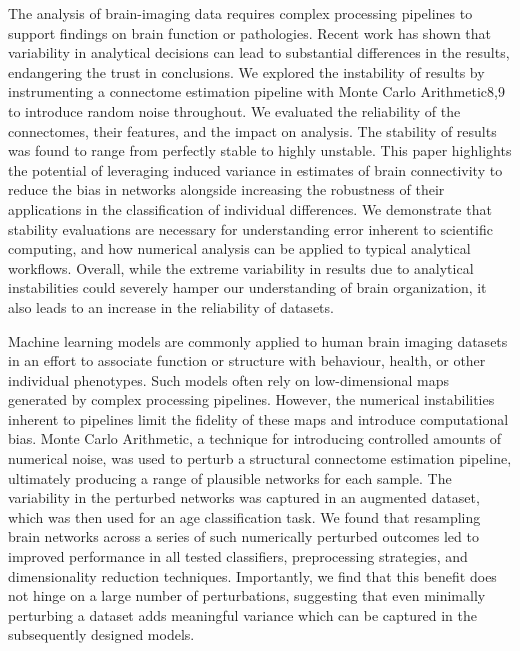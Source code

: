The analysis of brain-imaging data requires complex processing pipelines to support findings on brain function or
pathologies. Recent work has shown that variability in analytical decisions can lead to substantial differences in the
results, endangering the trust in conclusions. We explored the instability of results by instrumenting a connectome
estimation pipeline with Monte Carlo Arithmetic8,9 to introduce random noise throughout. We evaluated the reliability
of the connectomes, their features, and the impact on analysis. The stability of results was found to range from
perfectly stable to highly unstable. This paper highlights the potential of leveraging induced variance in estimates of
brain connectivity to reduce the bias in networks alongside increasing the robustness of their applications in the
classification of individual differences. We demonstrate that stability evaluations are necessary for understanding
error inherent to scientific computing, and how numerical analysis can be applied to typical analytical workflows.
Overall, while the extreme variability in results due to analytical instabilities could severely hamper our
understanding of brain organization, it also leads to an increase in the reliability of datasets.

Machine learning models are commonly applied to human brain imaging datasets in an effort to associate function or
structure with behaviour, health, or other individual phenotypes. Such models often rely on low-dimensional maps
generated by complex processing pipelines. However, the numerical instabilities inherent to pipelines limit the
fidelity of these maps and introduce computational bias. Monte Carlo Arithmetic, a technique for introducing
controlled amounts of numerical noise, was used to perturb a structural connectome estimation pipeline, ultimately
producing a range of plausible networks for each sample. The variability in the perturbed networks was captured in an
augmented dataset, which was then used for an age classification task. We found that resampling brain networks across a
series of such numerically perturbed outcomes led to improved performance in all tested classifiers, preprocessing
strategies, and dimensionality reduction techniques. Importantly, we find that this benefit does not hinge on a large
number of perturbations, suggesting that even minimally perturbing a dataset adds meaningful variance which can be
captured in the subsequently designed models.

